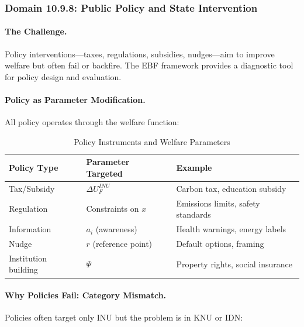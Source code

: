 \subsubsection{Domain 10.9.8: Public Policy and State Intervention}
\label{subsubsec:public-policy}

\paragraph{The Challenge.}
Policy interventions---taxes, regulations, subsidies, nudges---aim to improve
welfare but often fail or backfire. The EBF framework provides a diagnostic
tool for policy design and evaluation.

\paragraph{Policy as Parameter Modification.}
All policy operates through the welfare function:

\begin{table}[htbp]
\centering
\caption{Policy Instruments and Welfare Parameters}
\label{tab:policy-instruments}
\renewcommand{\arraystretch}{1.3}
\begin{tabular}{@{}lll@{}}
\toprule
\textbf{Policy Type} & \textbf{Parameter Targeted} & \textbf{Example} \\
\midrule
Tax/Subsidy & $\Delta U^{INU}_F$ & Carbon tax, education subsidy \\
Regulation & Constraints on $x$ & Emissions limits, safety standards \\
Information & $a_i$ (awareness) & Health warnings, energy labels \\
Nudge & $r$ (reference point) & Default options, framing \\
Institution building & $\Psi$ & Property rights, social insurance \\
\bottomrule
\end{tabular}
\end{table}

\paragraph{Why Policies Fail: Category Mismatch.}
Policies often target only INU but the problem is in KNU or IDN:

